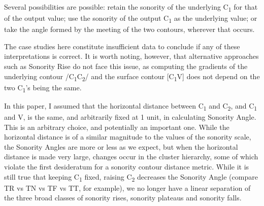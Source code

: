 \documentclass[12pt]{article}
\begin{document}
Several possibilities are possible: retain the sonority of the underlying C\textsubscript{1} for that of the output value; use the sonority of the output C\textsubscript{1} as the underlying value; or take the angle formed by the meeting of the two contours, wherever that occurs. 

\begin{center}
\end{center}

The case studies here constitute insufficient data to conclude if any of these interpretations is correct. It is worth noting, however, that alternative approaches such as {\sc Sonority Rise} do not face this issue, as computing the gradients of the underlying contour /C\textsubscript{1}C\textsubscript{2}/ and the surface contour [C\textsubscript{1}V] does not depend on the two C\textsubscript{1}'s being the same.

\bigskip

 In this paper, I assumed that the horizontal distance between C\textsubscript{1} and C\textsubscript{2}, and C\textsubscript{1} and V, is the same, and arbitrarily fixed at 1 unit, in calculating {\sc Sonority Angle}. This is an arbitrary choice, and potentially an important one. While the horizontal distance is of a similar magnitude to the values of the sonority scale, the {\sc Sonority Angles} are more or less as we expect, but when the horizontal distance is made very large, changes occur in the cluster hierarchy, some of which violate the first desideratum for a sonority contour distance metric. While it is still true that keeping C\textsubscript{1} fixed, raising C\textsubscript{2} decreases the {\sc Sonority Angle} (compare TR vs TN vs TF vs TT, for example), we no longer have a linear separation of the three broad classes of sonority rises, sonority plateaus and sonority falls.
\end{document}
